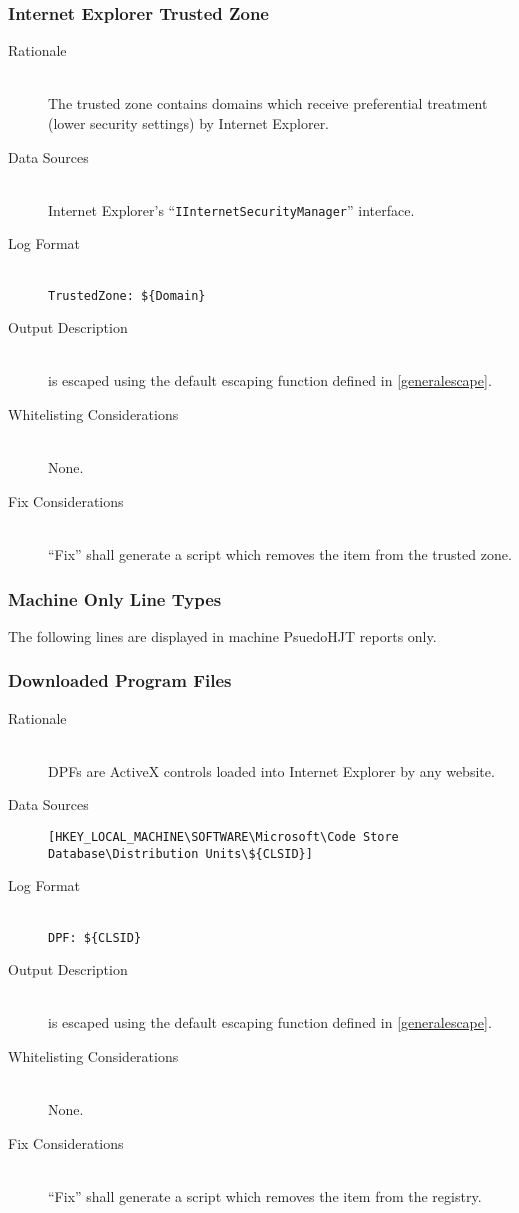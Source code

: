 \subsubsection{Internet Explorer Trusted Zone}
\begin{description}
\item[Rationale] \hfill \\
The trusted zone contains domains which receive preferential treatment (lower
security settings) by Internet Explorer.
\item[Data Sources] \hfill \\
Internet Explorer's ``\verb|IInternetSecurityManager|'' interface.
\item[Log Format] \hfill \\
\verb|TrustedZone: ${Domain}|
\item[Output Description] \hfill \\
 is escaped using the default escaping function defined in
\ref{generalescape}.
\item[Whitelisting Considerations] \hfill \\
None.
\item[Fix Considerations] \hfill \\
``Fix'' shall generate a script which removes the item from the trusted zone.
\end{description}

\subsubsection{Machine Only Line Types}
The following lines are displayed in machine PsuedoHJT reports only.

\subsubsection{Downloaded Program Files}
\begin{description}
\item[Rationale] \hfill \\
DPFs are ActiveX controls loaded into Internet Explorer by any website.
\item[Data Sources] \hfill
\vspace{-\baselineskip}
\begin{verbatim}
[HKEY_LOCAL_MACHINE\SOFTWARE\Microsoft\Code Store Database\Distribution Units\${CLSID}]
\end{verbatim}
\item[Log Format] \hfill \\
\verb|DPF: ${CLSID}|
\item[Output Description] \hfill \\
 is escaped using the default escaping function defined in \ref{generalescape}.
\item[Whitelisting Considerations] \hfill \\
None.
\item[Fix Considerations] \hfill \\
``Fix'' shall generate a script which removes the item from the registry.
\end{description}

